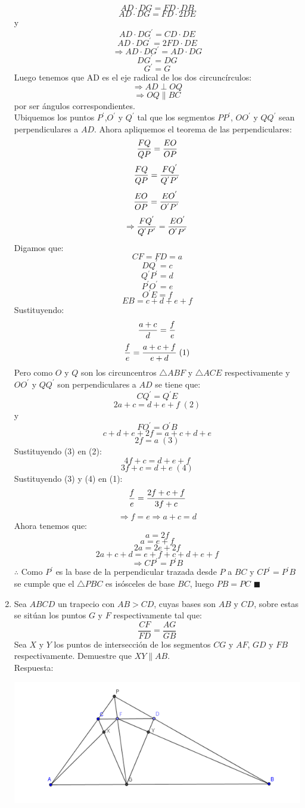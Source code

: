 \documentclass{book}
\begin{document}
\begin{enumerate}
$$AD\cdot DG=FD\cdot DB$$
$$AD\cdot DG=FD\cdot 2DE$$
y	
$$AD\cdot DG^{'}=CD\cdot DE$$
$$AD\cdot DG^{'}=2FD\cdot DE$$
$$\Rightarrow AD\cdot DG^{'}=AD\cdot DG$$
$$DG^{'}=DG$$
$$G^{'}=G$$
Luego tenemos que AD es el eje radical de los dos circuncírculos:
$$\Rightarrow AD\perp OQ$$
$$\Rightarrow OQ\parallel BC$$
por ser ángulos correspondientes.\\
Ubiquemos los puntos $P^{'}$,$O^{'}$ y $Q^{'}$ tal que los segmentos $PP^{'}$, $OO^{'}$ y  $QQ^{'}$ sean perpendiculares a $AD$. Ahora apliquemos el teorema de las perpendiculares: 
$${FQ\over QP}={EO\over OP}$$
$${FQ\over QP}={FQ^{'}\over Q^{'} P^{'} }$$
$${EO\over OP}={EO^{'}\over O^{'} P^{'} }$$
$$\Rightarrow{FQ^{'}\over Q^{'} P^{'} }={EO^{'}\over O^{'} P^{'} }$$
Digamos que:
$$CF=FD=a$$
$$DQ^{'}=c$$
$$Q^{'} P^{'}=d$$
$$P^{'} O^{'}=e$$
$$O^{'} E=f$$
$$EB=c+d+e+f$$
Sustituyendo:
$${a+c\over d}={f\over e} $$ 
$${f\over e}={a+c+f\over e+d}\;  (1)$$
Pero como $O$ y $Q$ son los circuncentros $\triangle ABF$ y $\triangle ACE$ respectivamente y $OO^{'}$ y  $QQ^{'}$ son perpendiculares a $AD$ se tiene que:
$$CQ^{'}=Q^{'} E$$
$$2a+c=d+e+f\; (2)$$
y
$$FO^{'}=O^{'} B$$
$$c+d+e+2f=a+c+d+e$$
$$2f=a\; (3)$$
Sustituyendo (3) en (2):
$$4f+c=d+e+f $$
$$3f+c=d+e\; (4)$$
Sustituyendo (3) y (4) en (1):
$${f\over e}={2f+c+f\over 3f+c}$$
$$\Rightarrow f=e\Rightarrow a+c=d$$
Ahora tenemos que:
$$a=2f$$
$$a=e+f$$
$$2a=2e+2f$$
$$2a+c+d=e+f+c+d+e+f$$
$$\Rightarrow CP^{'}=P^{'} B$$
$\therefore$ Como $P^{'}$ es la base de la perpendicular trazada desde $P$ a $BC$ y $CP^{'}=P^{'} B$ se cumple que el $\triangle PBC$ es isósceles de base $BC$, luego  $PB = PC$ $\blacksquare$\\
				\item Sea $ABCD$ un trapecio con $AB > CD$, cuyas bases son $AB$ y $CD$, sobre estas se sitúan los puntos $G$ y $F$ respectivamente tal que: 
			$$\frac{CF}{FD}=\frac{AG}{GB}$$
 Sea $X$ y $Y$ los puntos de intersección de los segmentos $CG$ y $AF$, $GD$ y $FB$ respectivamente. Demuestre que $XY \parallel AB$. \\
 					Respuesta:
					\begin{center}
						\includegraphics[scale=1]{imagenes/Geometria/13.png}

\end{center}
\end{enumerate}
\end{document}
